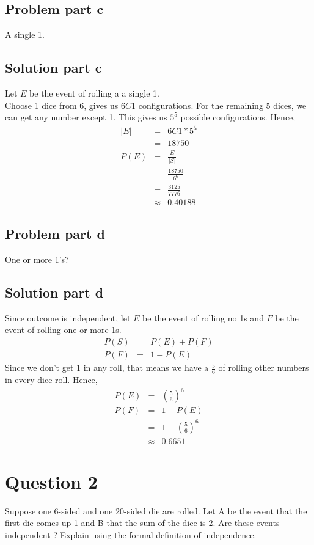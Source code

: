 \documentclass[12pt]{article}%
\newcommand\abs[1]{\left|#1\right|}
\begin{document}
\subsection*{Problem part c}
A single 1.
\subsection*{Solution part c}
Let $E$ be the event of rolling a a single 1. \\
Choose 1 dice from 6, gives us $6C1$ configurations. For the remaining 5 dices, we can get any number except 1. This gives us $5^5$ possible configurations. Hence,
\begin{eqnarray*}
\abs{E} & = & 6C1 * 5^5 \\
 		& = & 18750 \\
P(E) & = & \frac{\abs{E}}{\abs{S}} \\
	 & = & \frac{18750}{6^6} \\
	 & = & \frac{3125}{7776} \\
	 & \approx & 0.40188
\end{eqnarray*}
\subsection*{Problem part d}
One or more 1’s?
\subsection*{Solution part d}
Since outcome is independent, let $E$ be the event of rolling no 1s and $F$ be the event of rolling one or more 1s. 
\begin{eqnarray*}
P(S) & = & P(E) + P(F) \\
P(F) & = & 1 - P(E)
\end{eqnarray*}
Since we don't get 1 in any roll, that means we have a $\frac{5}{6}$ of rolling other numbers in every dice roll. Hence,
\begin{eqnarray*}
P(E) & = & (\frac{5}{6})^6 \\
P(F) & = & 1 - P(E) \\
	 & = & 1 - (\frac{5}{6})^6 \\
	 & \approx & 0.6651 
\end{eqnarray*}
\newpage
\section*{Question 2}
Suppose one 6-sided and one 20-sided die are rolled. Let A be the event that the first die comes up 1 and B that the sum of the dice is 2. Are these events independent ? Explain using the formal definition of independence.
\end{document}
